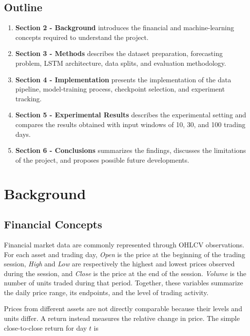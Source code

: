 \documentclass[12pt,a4paper]{article}
\begin{document}
\subsection{Outline}
 \begin{enumerate}
      \item \textbf{Section 2 - Background} introduces the financial and
      machine-learning concepts required to understand the project.

      \item \textbf{Section 3 - Methods} describes the dataset preparation,
      forecasting problem, LSTM architecture, data splits, and evaluation
      methodology.

      \item \textbf{Section 4 - Implementation} presents the implementation
      of the data pipeline, model-training process, checkpoint selection, and
      experiment tracking.

      \item \textbf{Section 5 - Experimental Results} describes the
      experimental setting and compares the results obtained with input windows
      of 10, 30, and 100 trading days.

      \item \textbf{Section 6 - Conclusions} summarizes the findings,
      discusses the limitations of the project, and proposes possible future
      developments.
  \end{enumerate}

\section{Background}

\subsection{Financial Concepts}

Financial market data are commonly represented through OHLCV observations.
For each asset and trading day, \textit{Open} is the price at the beginning of
the trading session, \textit{High} and \textit{Low} are respectively the
highest and lowest prices observed during the session, and \textit{Close} is
the price at the end of the session. \textit{Volume} is the number of units
traded during that period. Together, these variables summarize the daily price
range, its endpoints, and the level of trading activity.

Prices from different assets are not directly comparable because their levels
and units differ. A return instead measures the relative change in price. The
simple close-to-close return for day $t$ is
\end{document}
